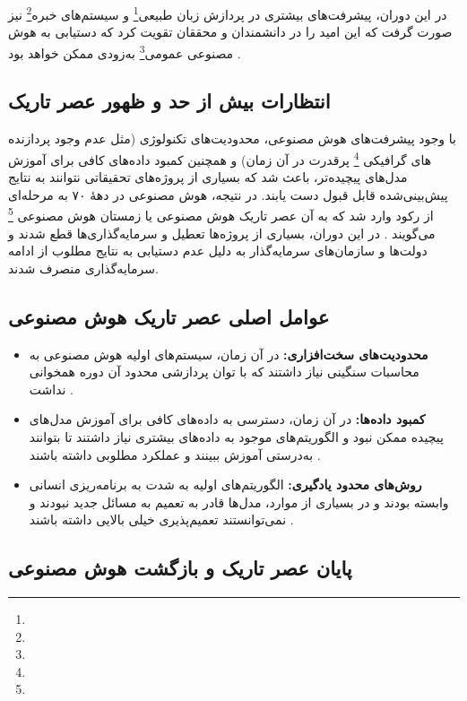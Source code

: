 در این دوران، پیشرفت‌های بیشتری در پردازش زبان طبیعی\footnote{} و سیستم‌های خبره\footnote{} نیز صورت گرفت که این امید را در دانشمندان و محققان تقویت کرد که دستیابی به هوش مصنوعی عمومی\footnote{} به‌زودی ممکن خواهد بود \cite{feigenbaum1983handbook}.


\subsection{انتظارات بیش از حد و ظهور عصر تاریک}

با وجود پیشرفت‌های هوش مصنوعی، محدودیت‌های تکنولوژی (مثل عدم وجود  پردازنده های گرافیکی  \footnote{} پرقدرت در آن زمان) و همچنین کمبود داده‌های کافی برای آموزش مدل‌های پیچیده‌تر، باعث شد که بسیاری از پروژه‌های تحقیقاتی نتوانند به نتایج پیش‌بینی‌شده قابل قبول دست یابند. در نتیجه، هوش مصنوعی در دههٔ ۷۰ به مرحله‌ای از رکود وارد شد که به آن عصر تاریک هوش مصنوعی یا زمستان هوش مصنوعی \footnote{} می‌گویند \cite{lighthill1973artificial,crevier1993ai}. در این دوران، بسیاری از پروژه‌ها تعطیل و سرمایه‌گذاری‌ها قطع شدند و دولت‌ها و سازمان‌های سرمایه‌گذار به دلیل عدم دستیابی به نتایج مطلوب از ادامه سرمایه‌گذاری منصرف شدند.


\subsection{عوامل اصلی عصر تاریک هوش مصنوعی}

\begin{itemize}
	\item \textbf{محدودیت‌های سخت‌افزاری:}  
	در آن زمان، سیستم‌های اولیه هوش مصنوعی به محاسبات سنگینی نیاز داشتند که با توان پردازشی محدود آن دوره همخوانی نداشت \cite{nilsson2010quest}.
	
	\item \textbf{کمبود داده‌ها:}  
	در آن زمان، دسترسی به داده‌های کافی برای آموزش مدل‌های پیچیده ممکن نبود و الگوریتم‌های موجود به داده‌های بیشتری نیاز داشتند تا بتوانند به‌درستی آموزش ببینند و عملکرد مطلوبی داشته باشند \cite{crevier1993ai}.
	
	\item \textbf{روش‌های محدود یادگیری:}  
	الگوریتم‌های اولیه به شدت به برنامه‌ریزی انسانی وابسته بودند و در بسیاری از موارد، مدل‌ها قادر به تعمیم به مسائل جدید نبودند و نمی‌توانستند تعمیم‌پذیری خیلی بالایی داشته باشند \cite{russell2016artificial}.
\end{itemize}

\subsection{پایان عصر تاریک و بازگشت هوش مصنوعی}


